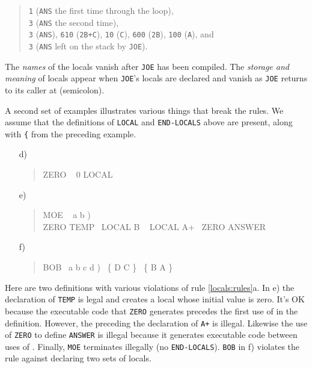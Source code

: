 \begin{quote}
	\texttt{1} (\texttt{ANS} the first time through the loop),\\
	\texttt{3} (\texttt{ANS} the second time), \\
	\texttt{3} (\texttt{ANS}),
		\texttt{610} (\texttt{2B+C}),
		\texttt{10}  (\texttt{C}),
		\texttt{600} (\texttt{2B}),
		\texttt{100} (\texttt{A}), and \\
	\texttt{3} (\texttt{ANS} left on the stack by \texttt{JOE}).
\end{quote}

The \emph{names} of the locals vanish after \texttt{JOE} has been
compiled.  The \emph{storage and meaning} of locals appear when
\texttt{JOE}'s locals are declared and vanish as \texttt{JOE} returns
to its caller at \word{;} (semicolon).

A second set of examples illustrates various things that break the
rules.  We assume that the definitions of \texttt{LOCAL} and
\texttt{END-LOCALS} above are present, along with \texttt{\{} from
the preceding example.

\begin{enumerate}
\item[d)] \begin{quote}\ttfamily
	\word{:} ZERO ~ 0    LOCAL
	\word{;} 
	\end{quote}

\item[e)] \begin{quote}\ttfamily
	\word{:} MOE ~ a b ) \\
	\tab ZERO TEMP ~LOCAL B ~ LOCAL A+ ~ZERO ANSWER \word{;}
	\end{quote}

\item[f)] \begin{quote}\ttfamily
	\word{:} BOB~  a b c d ) ~\{ D C \} ~\{ B A \} \word{;}
	\end{quote}
\end{enumerate}

Here are two definitions with various violations of rule
\ref{locals:rules}a. In e) the declaration of \texttt{TEMP} is legal
and creates a local whose initial value is zero. It's OK because the
executable code that \texttt{ZERO} generates precedes the first use of
 in the definition. However, the 
preceding the declaration of \texttt{A+} is illegal. Likewise the use
of \texttt{ZERO} to define \texttt{ANSWER} is illegal because it
generates executable code between uses of .
Finally, \texttt{MOE} terminates illegally (no \texttt{END-LOCALS}).
\texttt{BOB} in f) violates the rule against declaring two sets of
locals.

